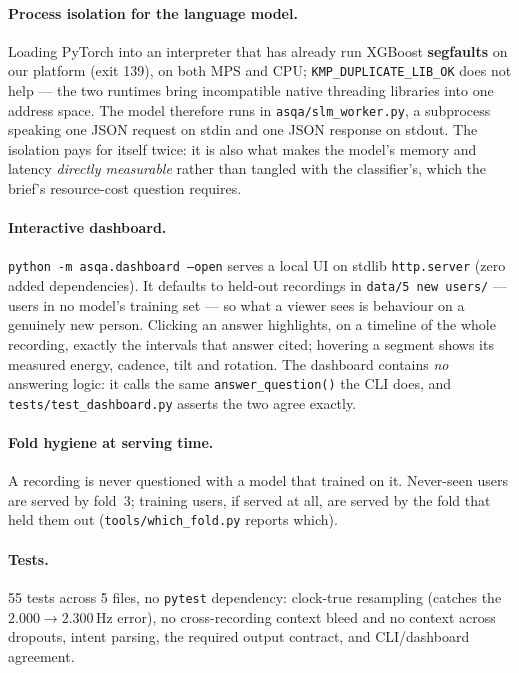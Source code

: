 \documentclass[11pt,a4paper]{article}
\newcommand{\code}[1]{\texttt{\small #1}}
\begin{document}
\paragraph{Process isolation for the language model.} Loading PyTorch into an
interpreter that has already run XGBoost \textbf{segfaults} on our platform (exit 139),
on both MPS and CPU; \code{KMP\_DUPLICATE\_LIB\_OK} does not help --- the two runtimes
bring incompatible native threading libraries into one address space. The model therefore
runs in \code{asqa/slm\_worker.py}, a subprocess speaking one JSON request on stdin and
one JSON response on stdout. The isolation pays for itself twice: it is also what makes
the model's memory and latency \emph{directly measurable} rather than tangled with the
classifier's, which the brief's resource-cost question requires.

\paragraph{Interactive dashboard.} \code{python -m asqa.dashboard --open} serves a local
UI on stdlib \code{http.server} (zero added dependencies). It defaults to held-out
recordings in \code{data/5 new users/} --- users in no model's training set --- so what a
viewer sees is behaviour on a genuinely new person. Clicking an answer highlights, on a
timeline of the whole recording, exactly the intervals that answer cited; hovering a
segment shows its measured energy, cadence, tilt and rotation. The dashboard contains
\emph{no} answering logic: it calls the same \code{answer\_question()} the CLI does, and
\code{tests/test\_dashboard.py} asserts the two agree exactly.

\paragraph{Fold hygiene at serving time.} A recording is never questioned with a model
that trained on it. Never-seen users are served by fold~3; training users, if served at
all, are served by the fold that held them out (\code{tools/which\_fold.py} reports
which).

\paragraph{Tests.} 55 tests across 5 files, no \code{pytest} dependency:
clock-true resampling (catches the $2.000 \rightarrow 2.300$\,Hz error), no
cross-recording context bleed and no context across dropouts, intent parsing, the
required output contract, and CLI/dashboard agreement.
\end{document}
